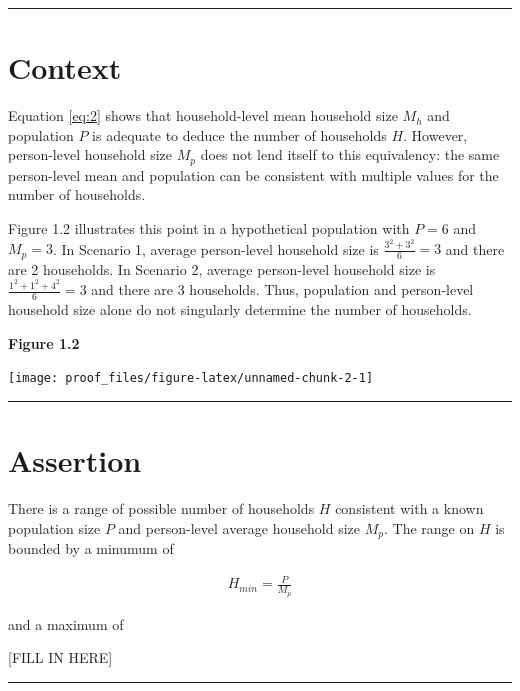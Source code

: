 \documentclass[
]{article}
\begin{document}
\begin{center}\rule{0.5\linewidth}{0.5pt}\end{center}

\hypertarget{context}{%
\section{Context}\label{context}}

Equation \eqref{eq:2} shows that household-level mean household size
\(M_h\) and population \(P\) is adequate to deduce the number of
households \(H\). However, person-level household size \(M_p\) does not
lend itself to this equivalency: the same person-level mean and
population can be consistent with multiple values for the number of
households.

Figure 1.2 illustrates this point in a hypothetical population with
\(P = 6\) and \(M_p = 3\). In Scenario 1, average person-level household
size is \(\frac{3^2 + 3^2}{6} = 3\) and there are 2 households. In
Scenario 2, average person-level household size is
\(\frac{1^2 + 1^2 + 4^2}{6} = 3\) and there are 3 households. Thus,
population and person-level household size alone do not singularly
determine the number of households.

\textbf{Figure 1.2}

\texttt{[image: proof\_files/figure-latex/unnamed-chunk-2-1]}

\begin{center}\rule{0.5\linewidth}{0.5pt}\end{center}

\hypertarget{assertion}{%
\section{Assertion}\label{assertion}}

There is a range of possible number of households \(H\) consistent with
a known population size \(P\) and person-level average household size
\(M_p\). The range on \(H\) is bounded by a minumum of

\begin{align}
H_{min} = \frac{P}{M_p}
\end{align}

and a maximum of

{[}FILL IN HERE{]}

\begin{center}\rule{0.5\linewidth}{0.5pt}\end{center}
\end{document}
